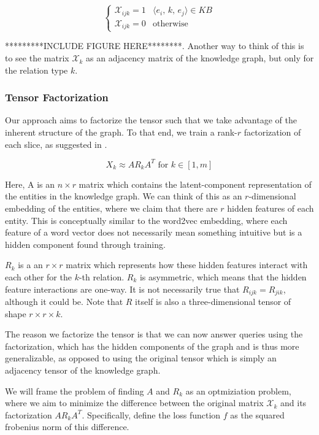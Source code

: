 \documentclass[pageno]{jpaper}
\begin{document}
$$
\begin{cases}
    \mathcal{X}_{ijk} = 1 & \langle e_i,\,k,\,e_j\rangle \in KB \\
    \mathcal{X}_{ijk} = 0 & \text{otherwise}
\end{cases}
$$

*********INCLUDE FIGURE HERE********. Another way
to think of this is to see the matrix $\mathcal{X}_k$ as an adjacency matrix
of the knowledge graph, but only for the relation type $k$. \\

\subsubsection{Tensor Factorization}
\label{Tensor Factorization}

Our approach aims to factorize the tensor such that we take advantage of the
inherent structure of the graph. To that end, we train a rank-$r$ factorization
of each slice, as suggested in \cite{Bader2007}\cite{Nickel2011}.

$$X_k \approx A R_k A^T \text{ for } k \in [1,m]$$

Here, A is an $n\times r$ matrix which contains the latent-component representation
of the entities in the knowledge graph. We can think of this as an $r$-dimensional
embedding of the entities, where we claim that there are $r$ hidden features of
each entity. This is conceptually similar to the word2vec embedding, where each
feature of a word vector does not necessarily mean something intuitive but is a
hidden component found through training.

$R_k$ is a an $r\times r$ matrix which represents how these hidden features
interact with each other for the $k$-th relation. $R_k$ is asymmetric, which
means that the hidden feature interactions are one-way. It is not necessarily
true that $R_{ijk} = R_{jik}$, although it could be. Note that $R$ itself is
also a three-dimensional tensor of shape $r\times r\times k$.

The reason we factorize the tensor is that we can now answer queries using the factorization,
which has the hidden components of the graph and is thus more generalizable, as
opposed to using the original tensor which is simply an adjacency tensor of the
knowledge graph.

We will frame the problem of finding $A$ and $R_k$ as an optmiziation problem,
where we aim to minimize the difference between the original matrix
$\mathcal{X}_k$ and its factorization $AR_kA^T$. Specifically, define the loss
function $f$ as the squared frobenius norm of this difference.
\end{document}
